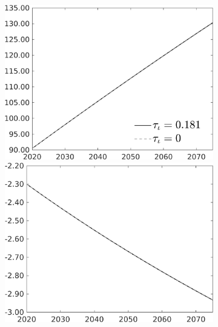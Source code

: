 \begin{figure}[h!!]
\begin{subfigure}{0.75\textwidth}
\begin{minipage}[]{0.32\textwidth}
\end{minipage}
\begin{minipage}[]{0.32\textwidth}
\includegraphics[width=1\textwidth]{../../codding_model/own_basedOnFried/optimalPol_010922_revision/figures/all_13Sept22/PerdifNoTauf_regime5_CompTaul_G_spillover0_nsk0_xgr0_knspil1_sep0_LFlimit0_emsbase0_countec0_GovRev0_etaa0.79_lgd1.png}
\end{minipage}
\begin{minipage}[]{0.32\textwidth}
	\includegraphics[width=1\textwidth]{../../codding_model/own_basedOnFried/optimalPol_010922_revision/figures/all_13Sept22/PerdifNoTauf_regime5_CompTaul_EY_spillover0_nsk0_xgr0_knspil1_sep0_LFlimit0_emsbase0_countec0_GovRev0_etaa0.79_lgd0.png}

\end{minipage}
\end{subfigure}
\end{figure}
